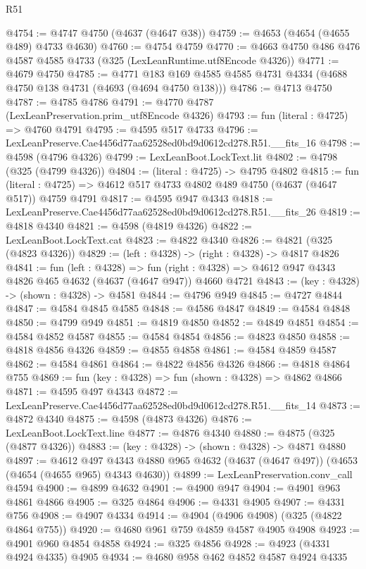 \begin{lexlean}{R51}
\begin{coremodule}
@4754 := @4747 @4750 (@4637 (@4647 @38))
@4759 := @4653 (@4654 (@4655 @489) @4733 @4630)
@4760 := @4754 @4759
@4770 := @4663 @4750 @486 @476 @4587 @4585 @4733 (@325 (LexLeanRuntime.utf8Encode @4326))
@4771 := @4679 @4750
@4785 := @4771 @183 @169 @4585 @4585 @4731 @4334 (@4688 @4750 @138 @4731 (@4693 (@4694 @4750 @138)))
@4786 := @4713 @4750
@4787 := @4785 @4786
@4791 := @4770 @4787 (LexLeanPreservation.prim_utf8Encode @4326)
@4793 := fun (literal : @4725) => @4760 @4791
@4795 := @4595 @517 @4733
@4796 := LexLeanPreserve.Cae4456d77aa62528ed0bd9d0612cd278.R51.__fits_16
@4798 := @4598 (@4796 @4326)
@4799 := LexLeanBoot.LockText.lit
@4802 := @4798 (@325 (@4799 @4326))
@4804 := (literal : @4725) -> @4795 @4802
@4815 := fun (literal : @4725) => @4612 @517 @4733 @4802 @489 @4750 (@4637 (@4647 @517)) @4759 @4791
@4817 := @4595 @947 @4343
@4818 := LexLeanPreserve.Cae4456d77aa62528ed0bd9d0612cd278.R51.__fits_26
@4819 := @4818 @4340
@4821 := @4598 (@4819 @4326)
@4822 := LexLeanBoot.LockText.cat
@4823 := @4822 @4340
@4826 := @4821 (@325 (@4823 @4326))
@4829 := (left : @4328) -> (right : @4328) -> @4817 @4826
@4841 := fun (left : @4328) =>
  fun (right : @4328) => @4612 @947 @4343 @4826 @465 @4632 (@4637 (@4647 @947)) @4660 @4721
@4843 := (key : @4328) -> (shown : @4328) -> @4581
@4844 := @4796 @949
@4845 := @4727 @4844
@4847 := @4584 @4845 @4585
@4848 := @4586 @4847
@4849 := @4584 @4848
@4850 := @4799 @949
@4851 := @4819 @4850
@4852 := @4849 @4851
@4854 := @4584 @4852 @4587
@4855 := @4584 @4854
@4856 := @4823 @4850
@4858 := @4818 @4856 @4326
@4859 := @4855 @4858
@4861 := @4584 @4859 @4587
@4862 := @4584 @4861
@4864 := @4822 @4856 @4326
@4866 := @4818 @4864 @755
@4869 := fun (key : @4328) => fun (shown : @4328) => @4862 @4866
@4871 := @4595 @497 @4343
@4872 := LexLeanPreserve.Cae4456d77aa62528ed0bd9d0612cd278.R51.__fits_14
@4873 := @4872 @4340
@4875 := @4598 (@4873 @4326)
@4876 := LexLeanBoot.LockText.line
@4877 := @4876 @4340
@4880 := @4875 (@325 (@4877 @4326))
@4883 := (key : @4328) -> (shown : @4328) -> @4871 @4880
@4897 := @4612
    @497
    @4343
    @4880
    @965
    @4632
    (@4637 (@4647 @497))
    (@4653 (@4654 (@4655 @965) @4343 @4630))
@4899 := LexLeanPreservation.conv_call @4594
@4900 := @4899 @4632
@4901 := @4900 @947
@4904 := @4901 @963 @4861 @4866
@4905 := @325 @4864
@4906 := @4331 @4905
@4907 := @4331 @756
@4908 := @4907 @4334
@4914 := @4904 (@4906 @4908) (@325 (@4822 @4864 @755))
@4920 := @4680 @961 @759 @4859 @4587 @4905 @4908
@4923 := @4901 @960 @4854 @4858
@4924 := @325 @4856
@4928 := @4923 (@4331 @4924 @4335) @4905
@4934 := @4680 @958 @462 @4852 @4587 @4924 @4335

\end{coremodule}
\end{lexlean}
